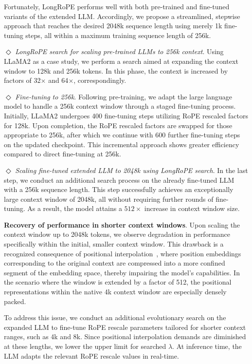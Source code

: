 Fortunately, LongRoPE performs well with both pre-trained and fine-tuned variants of the extended LLM. Accordingly, we propose a streamlined, stepwise approach that reaches the desired 2048k sequence length using merely 1k fine-tuning steps, all within a maximum training sequence length of 256k.

$\Diamond$ \textit{LongRoPE search for scaling pre-trained LLMs to 256k context}. Using LLaMA2 as a case study, we perform a search aimed at expanding the context window to 128k and 256k tokens. In this phase, the context is increased by factors of 32$\times$ and 64$\times$, correspondingly.

$\Diamond$ \textit{Fine-tuning to 256k}. Following pre-training, we adapt the large language model to handle a 256k context window through a staged fine-tuning process. Initially, LLaMA2 undergoes 400 fine-tuning steps utilizing RoPE rescaled factors for 128k. Upon completion, the RoPE rescaled factors are swapped for those appropriate to 256k, after which we continue with 600 further fine-tuning steps on the updated checkpoint. This incremental approach shows greater efficiency compared to direct fine-tuning at 256k.

$\Diamond$ \textit{Scaling fine-tuned extended LLM to 2048k using LongRoPE search}. In the last step, we conduct an additional search process on the already fine-tuned LLM with a 256k sequence length. This step successfully achieves an exceptionally large context window of 2048k, all without requiring further rounds of fine-tuning. As a result, the model attains a $512\times$ increase in context window size.

\textbf{Recovery of performance in shorter context windows}.  Upon scaling the context window up to 2048k tokens, we observe degradation in performance specifically within the initial, smaller context window. This drawback is a recognized consequence of positional interpolation~\cite{pi}, where position embeddings corresponding to the original context are compressed into a more confined segment of the embedding space, thereby impairing the model's capabilities. In the scenario where the window is extended by a factor of 512, the positional representations within the native 4k context window are especially densely packed.

To address this issue, we conduct an additional evolutionary search on the expanded LLM to fine-tune RoPE rescale parameters tailored for shorter context ranges, such as 4k and 8k. Since positional interpolation demands are diminished at these lengths, we lower the upper limit for searched $\lambda$. At inference time, the LLM adapts the relevant RoPE rescale values in real-time.

